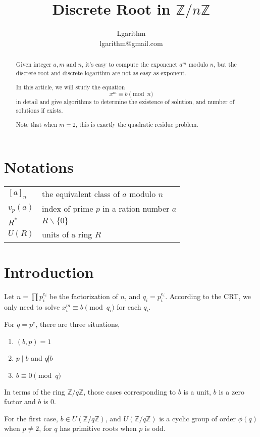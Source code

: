 \documentclass{article}
\title{Discrete Root in $\mathbb Z / n \mathbb Z$}
\author{Lgarithm\\\mbox{lgarithm@gmail.com}}
\def\zmod#1{\mathbb Z / {#1} \mathbb Z}
\def\zmodu#1{U(\mathbb Z / {#1} \mathbb Z)}
\begin{document}
\maketitle
\begin{abstract}
Given integer $a, m$ and $n$, it's easy to compute the exponenet $a^m$ modulo $n$,
but the discrete root and discrete logarithm are not as easy as exponent.

In this article, we will study the equation
$$x^m \equiv b \pmod n$$
in detail and give algorithms to determine the existence of solution,
and number of solutions if exists.

Note that when $m = 2$, this is exactly the quadratic residue problem.
\end{abstract}

\section*{Notations}
\begin{tabular}{l l}
$[a]_n$    & the equivalent class of $a$ modulo $n$ \\
$v_p(a)$   & index of prime $p$ in a ration number $a$ \\
$R^\ast$   & $R \backslash \{0\}$ \\
$U(R)$     & units of a ring $R$ \\
\end{tabular}
\tableofcontents

\newpage

\section{Introduction}
Let $n = \prod p_i^{e_i}$ be the factorization of $n$, and $q_i = p_i^{e_i}$.
According to the CRT, we only need to solve $x_i^m \equiv b \pmod {q_i}$ for each $q_i$.

For $q = p^e$, there are three situations,
\begin{enumerate}
\item $(b, p) = 1$
\item $p \mid b$ and $q \not| b$
\item $b \equiv 0 \pmod q$
\end{enumerate}
In terms of the ring $\zmod q$, those cases corresponding to $b$ is a unit, $b$ is a zero factor
and $b$ is 0.

For the first case, $b \in \zmodu q$, and $\zmodu q$ is a cyclic
group of order $\phi(q)$ when $p \neq 2$, for $q$ has primitive roots when $p$ is odd.
\end{document}
